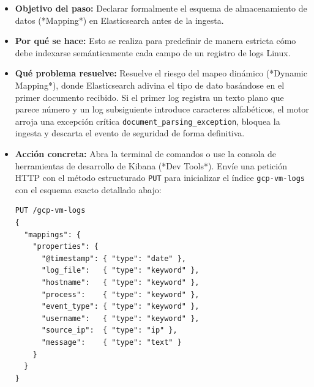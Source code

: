 \documentclass[
  coursetitle={Cómputo Nube y Tecnologías Emergentes},
  coursehours={96},
  coursedate={Verano 2026},
  doctype={Guía de Laboratorio Práctico},
  otherlangs={english,french},
  authorname={Lázaro},
  authorsurname={Bustio-Martínez},
  authortitle={PhD},
  role={Profesor Investigador},
  email={lbustio@inaoe.mx},
  phone={5559504000},
  ext={7459},
  institution={Instituto Nacional de Astrofísica, Óptica y Electrónica (INAOE)},
  department={Maestría en Ciencias en Tecnologías de Seguridad},
  address={Luis Enrique Erro 1, Sta. Ma. Tonantzintla, San Andrés Cholula, CP 72840, Puebla, México},
  margin={0.5in}
]{../../lbustio_lecture_notes}
\begin{document}
\begin{itemize}
    \item \textbf{Objetivo del paso:} Declarar formalmente el esquema de almacenamiento de datos (*Mapping*) en Elasticsearch antes de la ingesta.
    \item \textbf{Por qué se hace:} Esto se realiza para predefinir de manera estricta cómo debe indexarse semánticamente cada campo de un registro de logs Linux.
    \item \textbf{Qué problema resuelve:} Resuelve el riesgo del mapeo dinámico (*Dynamic Mapping*), donde Elasticsearch adivina el tipo de dato basándose en el primer documento recibido. Si el primer log registra un texto plano que parece número y un log subsiguiente introduce caracteres alfabéticos, el motor arroja una excepción crítica \texttt{document\_parsing\_exception}, bloquea la ingesta y descarta el evento de seguridad de forma definitiva.
    \item \textbf{Acción concreta:} Abra la terminal de comandos o use la consola de herramientas de desarrollo de Kibana (*Dev Tools*). Envíe una petición HTTP con el método estructurado \texttt{PUT} para inicializar el índice \texttt{gcp-vm-logs} con el esquema exacto detallado abajo:
    
\begin{verbatim}
PUT /gcp-vm-logs
{
  "mappings": {
    "properties": {
      "@timestamp": { "type": "date" },
      "log_file":   { "type": "keyword" },
      "hostname":   { "type": "keyword" },
      "process":    { "type": "keyword" },
      "event_type": { "type": "keyword" },
      "username":   { "type": "keyword" },
      "source_ip":  { "type": "ip" },
      "message":    { "type": "text" }
    }
  }
}
\end{verbatim}


\end{itemize}
\end{document}

